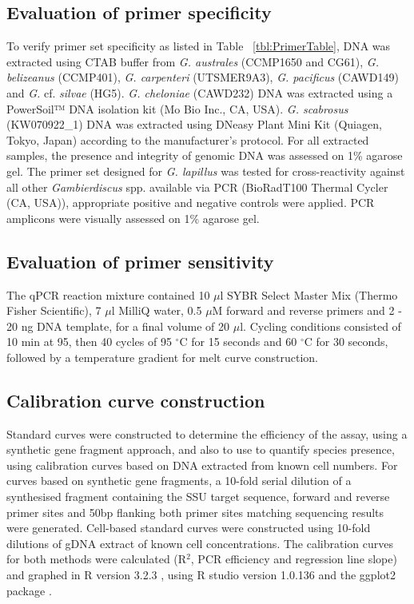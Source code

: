 \documentclass[12pt]{article}
\begin{document}
\subsection*{Evaluation of primer specificity}
To verify primer set specificity as listed in Table ~\ref{tbl:PrimerTable}, DNA was extracted using CTAB buffer \cite{zhou1999analysis} from \emph{G. australes} (CCMP1650 and CG61), \emph{G. belizeanus} (CCMP401), \emph{G. carpenteri} (UTSMER9A3), \emph{G. pacificus} (CAWD149) and \emph{G.} cf. \emph{silvae} (HG5). 
\emph{G. cheloniae} (CAWD232) DNA was extracted using a PowerSoil™ DNA isolation kit (Mo Bio Inc., CA, USA). 
\emph{G. scabrosus} (KW070922\_1) DNA was extracted using DNeasy Plant Mini Kit (Quiagen, Tokyo, Japan) according to the manufacturer's protocol. 
For all extracted samples, the presence and integrity of genomic DNA was assessed on 1\% agarose gel. 
The primer set designed for \emph{G. lapillus} %
was tested for cross-reactivity against all other \emph{Gambierdiscus} spp. available via PCR (BioRadT100 Thermal Cycler (CA, USA)), appropriate positive and negative controls were applied. 
PCR amplicons were visually assessed on 1\% agarose gel.


\subsection*{Evaluation of primer sensitivity}
The qPCR reaction mixture contained 10 $\mu$l SYBR Select Master Mix (Thermo Fisher Scientific), 7 $\mu$l MilliQ water, 0.5 $\mu$M forward and reverse primers and 2 - 20 ng DNA template, for a final volume of 20 $\mu$l. 
Cycling conditions consisted of 10 min at 95, then 40 cycles of 95 $^{\circ}$C for 15 seconds and 60 $^{\circ}$C for 30 seconds, followed by a temperature gradient for melt curve construction.
\subsection*{Calibration curve construction}
Standard curves were constructed to determine the efficiency of the assay, using a synthetic gene fragment approach, and also to use to quantify species presence, using calibration curves based on DNA extracted from known cell numbers. 
For curves based on synthetic gene fragments, a 10-fold serial dilution of a synthesised fragment containing the SSU target sequence, forward and reverse primer sites and 50bp flanking both primer sites matching sequencing results were generated. 
Cell-based standard curves were constructed using 10-fold dilutions of gDNA extract of known cell concentrations.
The calibration curves for both methods were calculated (R$^{2}$, PCR efficiency and regression line slope) and graphed in R version 3.2.3 \citep{rlang}, using R studio version 1.0.136 \citep{rstudio} and the ggplot2 package \citep{ggplot2}. 
\end{document}
